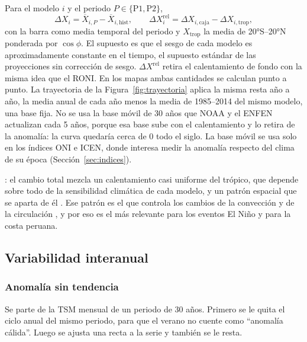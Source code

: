 \documentclass[11pt,a4paper]{article}
\begin{document}
Para el modelo $i$ y el periodo $P \in \{\mathrm{P1}, \mathrm{P2}\}$,
\begin{equation}
\label{eq:delta}
\Delta X_i = \overline{X}_{i,P} - \overline{X}_{i,\mathrm{hist}}, \qquad
\Delta X^{\mathrm{rel}}_i = \Delta X_{i,\mathrm{caja}} - \Delta X_{i,\mathrm{trop}},
\end{equation}
con la barra como media temporal del periodo y $X_{\mathrm{trop}}$ la media de 20°S--20°N ponderada por $\cos\phi$.
El supuesto es que el sesgo de cada modelo es aproximadamente constante en el tiempo, el supuesto estándar de las proyecciones sin corrección de sesgo.
$\Delta X^{\mathrm{rel}}$ retira el calentamiento de fondo con la misma idea que el RONI.
En los mapas ambas cantidades se calculan punto a punto.
La trayectoria de la Figura~\ref{fig:trayectoria} aplica la misma resta año a año, la media anual de cada año menos la media de 1985--2014 del mismo modelo, una base fija.
No se usa la base móvil de 30 años que NOAA y el ENFEN actualizan cada 5 años, porque esa base sube con el calentamiento y lo retira de la anomalía: la curva quedaría cerca de 0 todo el siglo.
La base móvil se usa solo en los índices ONI e ICEN, donde interesa medir la anomalía respecto del clima de su época (Sección~\ref{sec:indices}).

: el cambio total mezcla un calentamiento casi uniforme del trópico, que depende sobre todo de la sensibilidad climática de cada modelo, y un patrón espacial que se aparta de él \citep{xie2010,ma2013}.
Ese patrón es el que controla los cambios de la convección y de la circulación \citep{johnson2010}, y por eso es el más relevante para los eventos El Niño y para la costa peruana.

\subsection{Variabilidad interanual}
\label{sec:variabilidad}

\subsubsection{Anomalía sin tendencia}

Se parte de la TSM mensual de un periodo de 30 años.
Primero se le quita el ciclo anual del mismo periodo, para que el verano no cuente como ``anomalía cálida''.
Luego se ajusta una recta a la serie y también se le resta.
\end{document}
